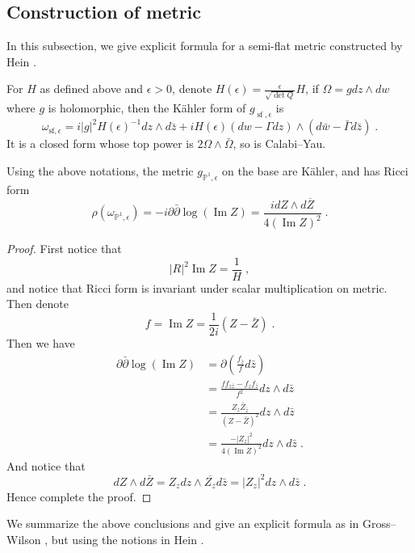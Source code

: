 \subsection{Construction of metric}
In this subsection, we give explicit formula for a semi-flat metric constructed by Hein \cite{hein2012gravitational}.
\begin{lemma}
For $H$ as defined above and $\epsilon>0$, denote $\displaystyle H(\epsilon)=\frac{\epsilon}{\sqrt{\det Q}}H$, if $\Omega=gdz\wedge dw$ where $g$ is holomorphic, then the K{\"a}hler form of $g_{\operatorname{sf},\epsilon}$ is
\[ \omega_{\mathrm{sf},\epsilon}=i|g|^2H(\epsilon)^{-1}dz\wedge d\bar{z}+iH(\epsilon)(dw-\Gamma dz)\wedge(d\bar{w}-\bar{\Gamma}d\bar{z})\; . \]
It is a closed form whose top power is $2\Omega\wedge\bar{\Omega}$, so is Calabi--Yau.
\end{lemma}
\begin{lemma}
Using the above notations, the metric $g_{\mathbb{P}^1,\epsilon}$ on the base are K{\"a}hler, and has Ricci form 
\[ \rho(\omega_{\mathbb{P}^1,\epsilon})=-i\partial\bar{\partial}\log(\operatorname{Im} Z)=\frac{i dZ\wedge d\overline{Z}}{4(\operatorname{Im} Z)^2}\; . \]
\end{lemma}
\begin{proof}
  First notice that \[ |R|^2\operatorname{Im} Z=\frac{1}{H}\; ,\]
and notice that Ricci form is invariant under scalar multiplication on metric. Then denote \[ f=\operatorname{Im} Z=\frac{1}{2i}(Z-\bar{Z})\; . \]
\indent Then we have
\begin{displaymath}
\begin{split}
\partial\bar{\partial}\log(\operatorname{Im} Z)&=\partial\left(\frac{f_{\bar{z}}}{f}d\bar{z}\right)\\
&=\frac{ff_{z\bar{z}}-f_z f_{\bar{z}}}{f^2}dz\wedge d\bar{z}\\
&=\frac{Z_z\bar{Z}_{\bar{z}}}{(Z-\bar{Z})^2}dz\wedge d\bar{z}\\
&=\frac{-|Z_z|^2}{4(\operatorname{Im} Z)^2}dz\wedge d\bar{z}\; .
\end{split}
\end{displaymath}
\indent And notice that 
\[ dZ\wedge d\bar{Z}=Z_zdz\wedge\overline{Z_z}d\bar{z}=|Z_z|^2dz\wedge d\bar{z}\; . \]
\indent Hence complete the proof.
\end{proof}
We summarize the above conclusions and give an explicit formula as in Gross--Wilson \cite{gross2000large}, but using the notions in Hein \cite{hein2012gravitational}.
